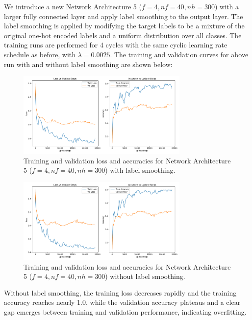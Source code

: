 \documentclass[11pt]{article}
\begin{document}
We introduce a new Network Architecture 5 ($f=4, nf=40, nh=300$) with a larger fully connected layer and apply label smoothing to the output layer. The label smoothing is applied by modifying the target labels to be a mixture of the original one-hot encoded labels and a uniform distribution over all classes. The training runs are performed for 4 cycles with the same cyclic learning rate schedule as before, with $\lambda = 0.0025$. 
The training and validation curves for above run with and without label smoothing are shown below:
\begin{figure}[H]
  \centering
  \includegraphics[width=0.75\textwidth]{results/architecture_ConvNet_smoothing_training_plot.png}
  \caption{Training and validation loss and accuracies for Network Architecture 5 ($f=4, nf=40, nh=300$) with label smoothing.}
  \label{fig:label_smoothing_arch5}
\end{figure}

\begin{figure}[H]
  \centering
  \includegraphics[width=0.75\textwidth]{results/architecture_ConvNet_no_smoothing_training_plot.png}
  \caption{Training and validation loss and accuracies for Network Architecture 5 ($f=4, nf=40, nh=300$) without label smoothing.}
  \label{fig:no_label_smoothing_arch5}
\end{figure}


Without label smoothing, the training loss decreases rapidly and the training accuracy reaches nearly 1.0, while the validation accuracy plateaus and a clear gap emerges between training and validation performance, indicating overfitting.
\end{document}
